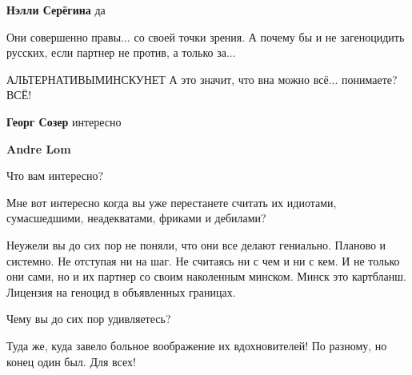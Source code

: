 \begin{itemize}
\begin{itemize}
\textbf{Нэлли Серёгина} да
\end{itemize}

 

\obeycr
Они совершенно правы... со своей точки зрения. А почему бы и не загеноцидить
русских, если партнер не против, а только за...

АЛЬТЕРНАТИВЫМИНСКУНЕТ
А это значит, что вна можно всё... понимаете? ВСЁ!
\restorecr

\begin{itemize}
 
\textbf{Георг Созер} интересно

 
\textbf{Andre Lom}

Что вам интересно?

Мне вот интересно когда вы уже перестанете считать их идиотами, сумасшедшими,
неадекватами, фриками и дебилами?

Неужели вы до сих пор не поняли, что они все делают гениально. Планово и
системно. Не отступая ни на шаг. Не считаясь ни с чем и ни с кем. И не только
они сами, но и их партнер со своим наколенным минском. Минск это картбланш.
Лицензия на геноцид в объявленных границах.

Чему вы до сих пор удивляетесь?
\end{itemize}

 

Туда же, куда завело больное воображение их вдохновителей! По разному, но конец один был. Для всех!


\end{itemize}
